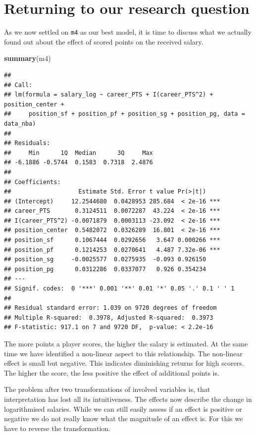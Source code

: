 \documentclass[
]{book}
\newenvironment{Shaded}{\begin{snugshade}}{\end{snugshade}}
\newcommand{\FunctionTok}[1]{\textcolor[rgb]{0.13,0.29,0.53}{\textbf{#1}}}
\newcommand{\NormalTok}[1]{#1}
\begin{document}
\hypertarget{returning-to-our-research-question-2}{%
\section{Returning to our research question}\label{returning-to-our-research-question-2}}

As we now settled on \texttt{m4} as our best model, it is time to discuss what we
actually found out about the effect of scored points on the received salary.

\begin{Shaded}
\begin{Highlighting}[]
\FunctionTok{summary}\NormalTok{(m4)}
\end{Highlighting}
\end{Shaded}

\begin{verbatim}
## 
## Call:
## lm(formula = salary_log ~ career_PTS + I(career_PTS^2) + position_center + 
##     position_sf + position_pf + position_sg + position_pg, data = data_nba)
## 
## Residuals:
##     Min      1Q  Median      3Q     Max 
## -6.1886 -0.5744  0.1583  0.7318  2.4876 
## 
## Coefficients:
##                   Estimate Std. Error t value Pr(>|t|)    
## (Intercept)     12.2544680  0.0428953 285.684  < 2e-16 ***
## career_PTS       0.3124511  0.0072287  43.224  < 2e-16 ***
## I(career_PTS^2) -0.0071879  0.0003113 -23.092  < 2e-16 ***
## position_center  0.5482072  0.0326289  16.801  < 2e-16 ***
## position_sf      0.1067444  0.0292656   3.647 0.000266 ***
## position_pf      0.1214253  0.0270641   4.487 7.32e-06 ***
## position_sg     -0.0025577  0.0275935  -0.093 0.926150    
## position_pg      0.0312286  0.0337077   0.926 0.354234    
## ---
## Signif. codes:  0 '***' 0.001 '**' 0.01 '*' 0.05 '.' 0.1 ' ' 1
## 
## Residual standard error: 1.039 on 9720 degrees of freedom
## Multiple R-squared:  0.3978, Adjusted R-squared:  0.3973 
## F-statistic: 917.1 on 7 and 9720 DF,  p-value: < 2.2e-16
\end{verbatim}

The more points a player scores, the higher the salary is estimated. At the same
time we have identified a non-linear aspect to this relationship. The non-linear
effect is small but negative. This indicates diminishing returns for high
scorers. The higher the score, the less positive the effect of additional points
is.

The problem after two transformations of involved variables is, that
interpretation has lost all its intuitiveness. The effects now describe the
change in logarithmised salaries. While we can still easily assess if an effect
is positive or negative we do not really know what the magnitude of an effect is.
For this we have to reverse the transformation.
\end{document}
